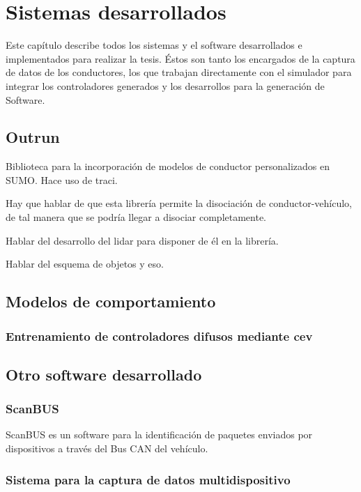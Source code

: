 \chapter{Sistemas desarrollados}
\label{ch:developed-software}

Este capítulo describe todos los sistemas y el software desarrollados e implementados para realizar la tesis. Éstos son tanto los encargados de la captura de datos de los conductores, los que trabajan directamente con el simulador para integrar los controladores generados y los desarrollos para la generación de Software.

\section{Outrun}

Biblioteca para la incorporación de modelos de conductor personalizados en SUMO. Hace uso de \gls{traci}.

Hay que hablar de que esta librería permite la disociación de conductor-vehículo, de tal manera que se podría llegar a disociar completamente.

Hablar del desarrollo del lidar para disponer de él en la librería.

Hablar del esquema de objetos y eso.

\section{Modelos de comportamiento}

\subsection{Entrenamiento de controladores difusos mediante \gls{cev}}

\section{Otro software desarrollado}

\subsection{ScanBUS}

ScanBUS es un software para la identificación de paquetes enviados por dispositivos a través del Bus CAN del vehículo.

\subsection{Sistema para la captura de datos multidispositivo}

